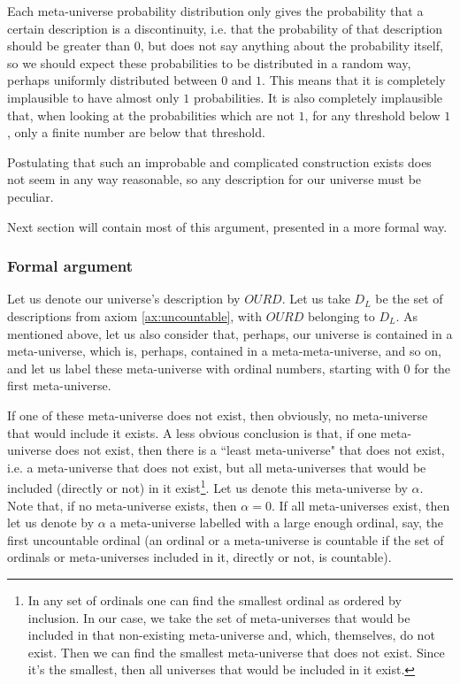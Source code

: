 \documentclass[a4paper
,draft
]{article}
\def\descriptions{D_L}
\def\our_description{OURD}
\newcommand{\ghilimele}[1]{``#1"}
\begin{document}
Each meta-universe probability distribution only gives the
probability that a certain description is a discontinuity, i.e. that
the probability of that description should be greater than $0$, but does not say
anything about the probability itself,
so we should expect these probabilities to
be distributed in a random way, perhaps uniformly distributed between $0$ and
$1$.
This means that it is completely implausible to have almost only $1$
probabilities.
It is also completely implausible that, when looking at the
probabilities which are not $1$, for any threshold below $1$, only a finite
number are below that threshold.

Postulating that such an improbable and complicated construction exists does
not seem in any way reasonable,
so any description for our universe must be peculiar.

Next section will contain most of this argument, presented in a more formal way.

\subsubsection{Formal argument}

Let us denote our universe's description by
$\our_description$. Let us take $\descriptions$ be the set of descriptions from
axiom \ref{ax:uncountable}, with $\our_description$ belonging to $\descriptions$.
As mentioned above, let us also consider that, perhaps, our universe is
contained in a meta-universe, which is, perhaps, contained in
a meta-meta-universe, and so on, and let us label these meta-universe
with ordinal numbers, starting with $0$ for the first meta-universe.

If one of these meta-universe does not exist, then obviously, no meta-universe
that would include it exists. A less obvious conclusion is that, if one
meta-universe does not exist, then there is a \ghilimele{least meta-universe}
that does not exist, i.e. a meta-universe that does not exist,
but all meta-universes that would be
included (directly or not) in it exist\footnote{In any set of ordinals
one can find the smallest ordinal as ordered by inclusion.
In our case, we take the set of
meta-universes that would be included in that non-existing meta-universe and,
which, themselves, do not exist. Then we can find the smallest meta-universe
that does not exist. Since it's the smallest, then all universes that would
be included in it exist.}. Let us denote this meta-universe by $\alpha$. Note
that, if no meta-universe exists, then $\alpha=0$. If all
meta-universes exist, then let us denote by $\alpha$ a meta-universe labelled
with a large enough ordinal, say, the first uncountable ordinal
(an ordinal or a meta-universe is countable if the set of ordinals or
meta-universes included in it, directly or not, is countable).
\end{document}
